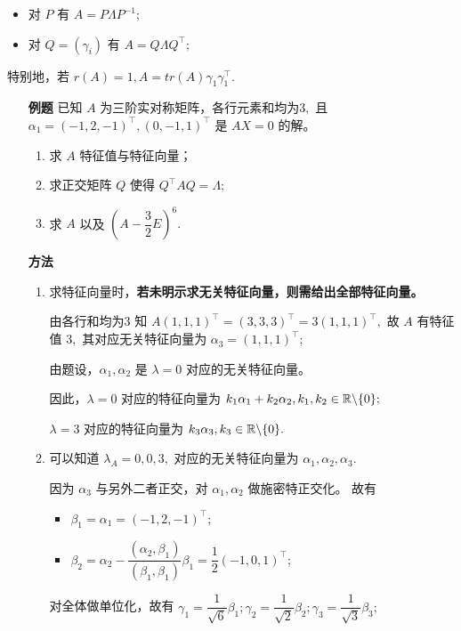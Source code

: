 
\begin{itemize}
    \item 对 $ P $ 有 $ A = P\Lambda P^{-1}; $ 
    \item 对 $ Q = (\gamma_i) $ 有 $ A = Q\Lambda Q^{\top}; $ 
\end{itemize}

特别地，若 $ r(A) = 1, A = tr(A)\gamma_1\gamma_1^\top. $ 

\begin{itemize}
    \item[\textbf{例题}] 已知 $ A $ 为三阶实对称矩阵，各行元素和均为$ 3, $ 且
    $ \alpha_1 = (-1,2,-1)^\top,(0,-1,1)^\top $ 是 $ AX = 0 $ 的解。
    \begin{enumerate}[label = \Roman*.]
        \item 求 $ A $ 特征值与特征向量；
        \item 求正交矩阵 $ Q $ 使得 $ Q^\top AQ = \Lambda; $ 
        \item 求 $ A $ 以及 $ (A-\dfrac{3}{2}E)^6. $ 
    \end{enumerate}
    \item[\textbf{方法}]
    \begin{enumerate}[label = \Roman*.]
        \item 求特征向量时，\textbf{若未明示求无关特征向量，则需给出全部特征向量。}
        
        由各行和均为$ 3 $ 知 $ A(1,1,1)^\top = (3,3,3)^\top = 3(1,1,1)^\top, $ 
        故 $ A $ 有特征值 $ 3, $ 其对应无关特征向量为 $ \alpha_3 = (1,1,1)^\top; $ 
        
        由题设，$ \alpha_1,\alpha_2 $ 是 $ \lambda = 0 $ 对应的无关特征向量。

        因此，$ \lambda = 0 $ 对应的特征向量为 $ k_1\alpha_1+k_2\alpha_2, k_1,k_2\in \mathbb R\backslash\{0\}; $ 
        
        $ \lambda = 3 $ 对应的特征向量为 $ k_3\alpha_3, k_3\in \mathbb R\backslash\{0\}. $ 
        \item 可以知道 $ \lambda_A = 0,0,3, $ 对应的无关特征向量为 $ \alpha_1,\alpha_2,\alpha_3. $ 
        
        因为 $ \alpha_3 $ 与另外二者正交，对 $ \alpha_1,\alpha_2 $ 做施密特正交化。
        故有\begin{itemize}
            \item $ \beta_1 = \alpha_1 = (-1,2,-1)^\top; $ 
            \item $ \beta_2 = \alpha_2 - \dfrac{(\alpha_2,\beta_1)}{(\beta_1,\beta_1)}\beta_1
            = \dfrac{1}{2}(-1,0,1)^\top; $ 
        \end{itemize}
        对全体做单位化，故有
        $ \gamma_1 = \dfrac{1}{\sqrt 6}\beta_1;  \gamma_2 = \dfrac{1}{\sqrt 2}\beta_2; 
        \gamma_3 = \dfrac{1}{\sqrt 3}\beta_3; $ 


\end{enumerate}
\end{itemize}
